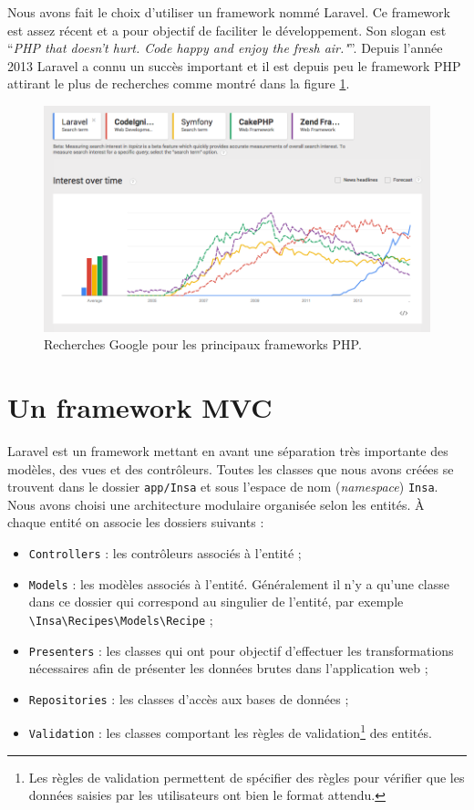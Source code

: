 Nous avons fait le choix d'utiliser un framework nommé Laravel. Ce framework est assez récent et a pour objectif de faciliter le développement. Son slogan est \enquote{\textit{PHP that doesn't hurt. Code happy and enjoy the fresh air."}}. Depuis l'année 2013 Laravel a connu un succès important et il est depuis peu le framework PHP attirant le plus de recherches comme montré dans la figure \ref{fig:trends-php-frameworks}.

\begin{figure}[H]
	\centering
	\includegraphics[width=1\textwidth]{images/trends-php-frameworks.png}
	\caption{Recherches Google pour les principaux frameworks PHP.}
	\label{fig:trends-php-frameworks}
\end{figure}

\section{Un framework MVC}
	Laravel est un framework mettant en avant une séparation très importante des modèles, des vues et des contrôleurs. Toutes les classes que nous avons créées se trouvent dans le dossier \verb|app/Insa| et sous l'espace de nom (\textit{namespace}) \verb|Insa|.\\

	Nous avons choisi une architecture modulaire organisée selon les entités. À chaque entité on associe les dossiers suivants :
	\begin{itemize}
		\item \verb|Controllers| : les contrôleurs associés à l'entité ;
		\item \verb|Models| : les modèles associés à l'entité. Généralement il n'y a qu'une classe dans ce dossier qui correspond au singulier de l'entité, par exemple \verb|\Insa\Recipes\Models\Recipe| ;
		\item \verb|Presenters| : les classes qui ont pour objectif d'effectuer les transformations nécessaires afin de présenter les données brutes dans l'application web ;
		\item \verb|Repositories| : les classes d'accès aux bases de données ;
		\item \verb|Validation| : les classes comportant les règles de validation\footnote{Les règles de validation permettent de spécifier des règles pour vérifier que les données saisies par les utilisateurs ont bien le format attendu.} des entités.
	\end{itemize}

